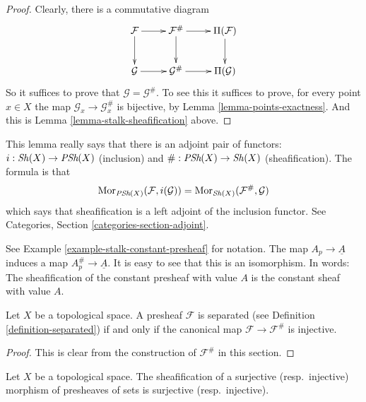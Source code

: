 \begin{proof}
Clearly, there is a commutative diagram
$$
\xymatrix{
\mathcal{F} \ar[r] \ar[d] &
\mathcal{F}^\# \ar[r] \ar[d] &
\Pi(\mathcal{F}) \ar[d] \\
\mathcal{G} \ar[r] &
\mathcal{G}^\# \ar[r] &
\Pi(\mathcal{G}) \\
}
$$
So it suffices to prove that $\mathcal{G} = \mathcal{G}^\#$.
To see this it suffices to prove, for every point $x \in X$ the
map $\mathcal{G}_x \to \mathcal{G}^\#_x$ is bijective, by
Lemma \ref{lemma-points-exactness}. And this is
Lemma \ref{lemma-stalk-sheafification} above.
\end{proof}

\noindent
This lemma really says that there is an adjoint pair
of functors: $i : \mathop{\mathit{Sh}}\nolimits(X) \to \textit{PSh}(X)$
(inclusion) and $\# : \textit{PSh}(X) \to \mathop{\mathit{Sh}}\nolimits(X)$
(sheafification). The formula is that
$$
\mathop{\mathrm{Mor}}\nolimits_{\textit{PSh}(X)}(\mathcal{F}, i(\mathcal{G}))
=
\mathop{\mathrm{Mor}}\nolimits_{\mathop{\mathit{Sh}}\nolimits(X)}(\mathcal{F}^\#, \mathcal{G})
$$
which says that sheafification is a left adjoint of
the inclusion functor. See Categories, Section
\ref{categories-section-adjoint}.

\begin{example}
\label{example-sheafify-constant}
See Example \ref{example-stalk-constant-presheaf} for notation.
The map $A_p \to \underline{A}$ induces a map
$A_p^\# \to \underline{A}$. It is easy to see that this
is an isomorphism. In words: The sheafification
of the constant presheaf with value $A$ is the
constant sheaf with value $A$.
\end{example}

\begin{lemma}
\label{lemma-separated-presheaf-into-sheaf}
\begin{reference}
\cite[Chapter I, \S 1, no. 3, Proposition 1, p. 200]{FAC}
\end{reference}
Let $X$ be a topological space.
A presheaf $\mathcal{F}$ is separated (see
Definition \ref{definition-separated}) if and only if
the canonical map $\mathcal{F} \to \mathcal{F}^\#$ is injective.
\end{lemma}

\begin{proof}
This is clear from the construction of $\mathcal{F}^\#$ in this
section.
\end{proof}

\begin{lemma}
\label{lemma-sheafify-epi-mono}
Let $X$ be a topological space. The sheafification of a surjective
(resp.\ injective) morphism of presheaves of sets is surjective
(resp.\ injective).
\end{lemma}

